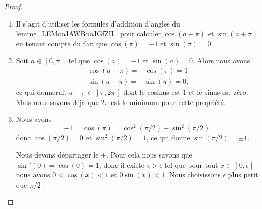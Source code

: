 \begin{proof}
\begin{enumerate}
		      Mais d'un autre côté, le nombre \( 2\pi\) est le plus petit \( T\) vérifiant \( \cos(T)=1\), \( \sin(T)=0\). Donc avoir \( \cos(\pi)=1\) n'est pas possible. Nous concluons
		      \begin{subequations}
			      \begin{numcases}{}
				      \cos(\pi)=-1\\
				      \sin(\pi)=0.
			      \end{numcases}
		      \end{subequations}
		\item
		      Il s'agit d'utiliser les formules d'addition d'angles du lemme~\ref{LEMooJAWBooJGfZIL} pour calculer \( \cos(a+\pi)\) et \( \sin(a+\pi)\) en tenant compte du fait que \( \cos(\pi)=-1\) et \( \sin(\pi)=0\).
		\item
		      Soit \( a\in\mathopen] 0 , \pi \mathclose[\) tel que \( \cos(a)=-1\) et \( \sin(a)=0\). Alors nous avons
			      \begin{subequations}
				      \begin{align}
					      \cos(a+\pi)=-\cos(\pi)=1 \\
					      \sin(a+\pi)=-\sin(\pi)=0,
				      \end{align}
			      \end{subequations}
			      ce qui donnerait \( a+\pi\in\mathopen] \pi , 2\pi \mathclose[\) dont le cosinus est \( 1\) et le sinus est zéro. Mais nous savons déjà que \( 2\pi\) est le minimum pour cette propriété.
		\item
		      Nous avons
		      \begin{equation}
			      -1=\cos(\pi)=\cos^2(\pi/2)-\sin^2(\pi/2),
		      \end{equation}
		      donc \( \cos(\pi/2)=0\) et \( \sin^2(\pi/2)=1\), ce qui donne \( \sin(\pi/2)=\pm 1\).

		      Nous devons départager le \( \pm\). Pour cela nous savons que \( \sin'(0)=\cos(0)=1\), donc il existe \( \epsilon>\epsilon\) tel que pour tout \( x\in\mathopen] 0 , \epsilon \mathclose[\) nous avons \( 0<\cos(x)<1\) et \( 0\sin(x)<1\). Nous choisissons \( \epsilon\) plus petit que \( \pi/2\) .


\end{enumerate}
\end{proof}
